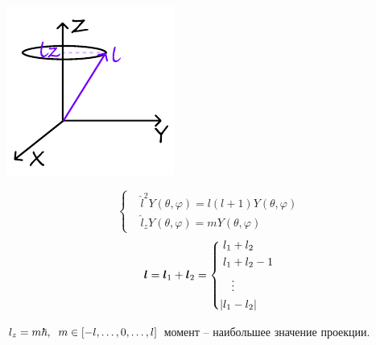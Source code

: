 \begin{minipage}{0.45\textwidth}
    \includegraphics[width=0.8\linewidth]{image/lz.pdf}
\end{minipage}
\hfill
\begin{minipage}{0.45\textwidth}
    \begin{equation*}
    	\left\{
    	\begin{aligned}
    		&\hat{l}^2 Y(\theta, \varphi) = l(l+1) Y(\theta, \varphi)\\
    		&\hat{l}_z Y(\theta, \varphi) = m Y(\theta, \varphi)
    	\end{aligned}
    	\right.
    \end{equation*}
    \begin{equation*}
    	\mbox{\boldmath $l$} = \mbox{\boldmath $l$}_1 + \mbox{\boldmath $l$}_2 = \left\{
    	\begin{aligned}
    		l_1 &+ l_2\\
    		l_1 &+ l_2 -1\\
    		&\vdots\\
    		|l_1 &- l_2|
    	\end{aligned}
    	\right.
    \end{equation*}

\end{minipage}
	$    
    	l_z = m\hbar, \hspace{2 mm} m \in [-l, \ldots, 0, \ldots, l]
    $
    момент -- наибольшее значение проекции.

